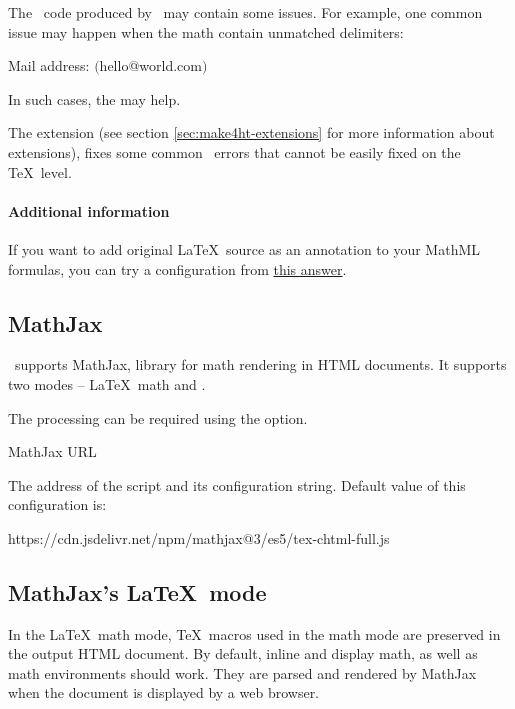 The \mathml\ code produced by \texfourht\ may contain some issues. For example,
one common issue may happen when the math contain unmatched delimiters:

\begin{texsource}
 Mail address: $\lparen$hello@world.com$\rparen$
\end{texsource}

In such cases, the  may help. 

The 
extension (see section \ref{sec:make4ht-extensions} for more
information about  extensions), fixes some common \mathml\
errors that cannot be easily fixed on the \TeX\ level. 

\paragraph{Additional information}

If you want to add original \LaTeX\ source as an annotation to your MathML formulas,
you can try a configuration from \href{https://tex.stackexchange.com/a/637910/2891}{this answer}.

\subsection{MathJax}
\texfourht\ supports MathJax, library for math rendering in HTML documents. 
 It supports two modes -- \LaTeX\ math and \mathml.

The  processing can be required using the  option.

 {MathJax URL}\EndDoc

The address of the  script and its configuration string. Default value of this configuration is:

\begin{texsource}
{https://cdn.jsdelivr.net/npm/mathjax@3/es5/tex-chtml-full.js}
\end{texsource}

\subsection{MathJax's \LaTeX\ mode}



In the \LaTeX\ math mode, \TeX\ macros used in the math mode are preserved in
the output HTML document. 
By default, inline and display math, as well as math environments should work.
They are parsed and rendered by MathJax when the
document is displayed by a web browser.

